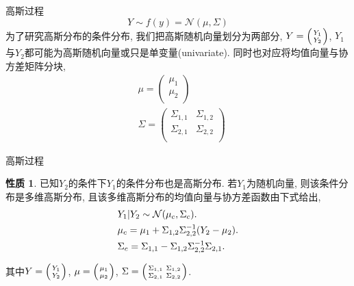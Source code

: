 \documentclass[10pt,mathserif]{beamer}
\theoremstyle{definition}
\newtheorem{property}{性质}[section] %
\numberwithin{equation}{section} %
\begin{document}
    \begin{frame}[fragile]{高斯过程}
        $$Y \sim f(y)=\mathcal{N}(\mu, \Sigma)$$
        为了研究高斯分布的条件分布, 我们把高斯随机向量划分为两部分, $Y=\left( {Y_{1}\atop Y_{2}}\right)$, $Y_{1}$与$Y_{2}$都可能为高斯随机向量或只是单变量(univariate). 同时也对应将均值向量与协方差矩阵分块,
        \begin{align}
            &\mu=   \begin{pmatrix}
                            \mu_{1} \\ \mu_{2} \\
                    \end{pmatrix}  \\
            &\Sigma=\begin{pmatrix}\label{2.13}
                        \Sigma_{1,1} & \Sigma_{1,2} \\
                        \Sigma_{2,1} & \Sigma_{2,2} \\
                    \end{pmatrix}
        \end{align}
    \end{frame}

    \begin{frame}[fragile]{高斯过程}
        \begin{property}
            已知$Y_{2}$的条件下$Y_{1}$的条件分布也是高斯分布. 若$Y_{1}$为随机向量, 则该条件分布是多维高斯分布, 且该多维高斯分布的均值向量与协方差函数由下式给出,
            \begin{align}
                &Y_{1}|Y_{2}\sim\mathcal{N}(\mu_{c}, \Sigma_{c}). \notag \\
                &\mu_{c}=\mu_{1}+\Sigma_{1,2}\Sigma_{2,2}^{-1}(Y_{2}-\mu_{2}). \\
                &\Sigma_{c}=\Sigma_{1,1}-\Sigma_{1,2}\Sigma^{-1}_{2,2}\Sigma_{2,1}.
            \end{align}
        \end{property}

        其中$Y=\left( {Y_{1}\atop Y_{2}}\right)$, $\mu=\left( {\mu_{1}\atop \mu_{2}}\right)$, $\Sigma=\left({\Sigma_{1,1} \ \Sigma_{1,2}\atop   \Sigma_{2,1} \ \Sigma_{2,2}} \right)$.
    \end{frame}
\end{document}
